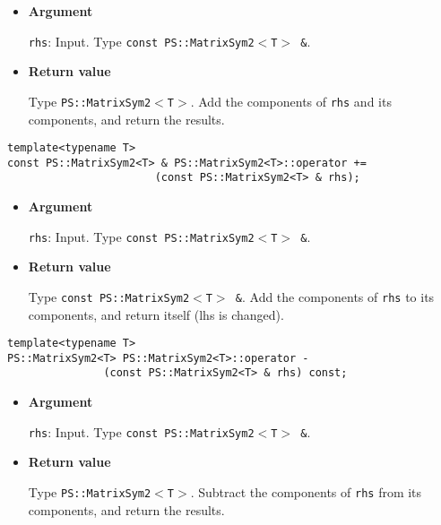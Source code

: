 \begin{itemize}

\item{{\bf Argument}}

\texttt{rhs}: Input. Type \texttt{const PS::MatrixSym2$<$T$>$ \&}.

\item{{\bf Return value}}

Type \texttt{PS::MatrixSym2$<$T$>$}. Add the components of \texttt{rhs} and its
components, and return the results.


\end{itemize}

\begin{screen}
\begin{verbatim}
template<typename T>
const PS::MatrixSym2<T> & PS::MatrixSym2<T>::operator += 
                       (const PS::MatrixSym2<T> & rhs);
\end{verbatim}
\end{screen}

\begin{itemize}

\item{{\bf Argument}}

\texttt{rhs}: Input. Type \texttt{const PS::MatrixSym2$<$T$>$ \&}.

\item{{\bf Return value}}

Type \texttt{const PS::MatrixSym2$<$T$>$ \&}. Add the components of \texttt{rhs} to its
components, and return itself (lhs is changed).

\end{itemize}

\begin{screen}
\begin{verbatim}
template<typename T>
PS::MatrixSym2<T> PS::MatrixSym2<T>::operator - 
               (const PS::MatrixSym2<T> & rhs) const;
\end{verbatim}
\end{screen}

\begin{itemize}

\item{{\bf Argument}}

\texttt{rhs}: Input. Type \texttt{const PS::MatrixSym2$<$T$>$ \&}.

\item{{\bf Return value}}

Type \texttt{PS::MatrixSym2$<$T$>$}. Subtract the components of \texttt{rhs} from its
components, and return the results.


\end{itemize}

